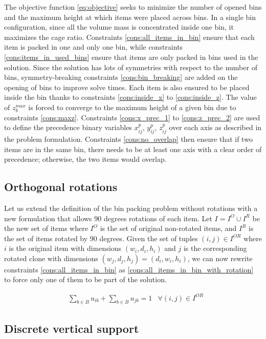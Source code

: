 The objective function \ref{eq:objective} seeks to minimize the number of opened bins and the maximum height at which items were placed across bins.
In a single bin configuration, since all the volume mass is concentrated inside one bin, it maximizes the cage ratio.
Constraints \ref{cons:all_items_in_bin} ensure that each item is packed in one and only one bin, while constraints \ref{cons:items_in_used_bins} ensure that items are only packed in bins used in the solution.
Since the solution has lots of symmetries with respect to the number of bins, symmetry-breaking constraints \ref{cons:bin_breaking} are added on the opening of bins to improve solve times.
Each item is also ensured to be placed inside the bin thanks to constraints \ref{cons:inside_x} to \ref{cons:inside_z}.
The value of $z^{max}_b$ is forced to converge to the maximum height of a given bin due to constraints \ref{cons:maxz}.
Constraints \ref{cons:x_prec_1} to \ref{cons:z_prec_2} are used to define the precedence binary variables $x^p_{ij}$, $y^p_{ij}$, $z^p_{ij}$ over each axis as described in the problem formulation.
Constraints \ref{cons:no_overlap} then ensure that if two items are in the same bin, there needs to be at least one axis with a clear order of precedence; otherwise, the two items would overlap.
\subsection{Orthogonal rotations}
\label{subsec:orthogonal_rotations}%

Let us extend the definition of the bin packing problem without rotations with a new formulation that allows $90$ degrees rotations of each item.
Let $I = I^O \cup I^R$ be the new set of items where $I^O$ is the set of original non-rotated items, and $I^R$ is the set of items rotated by $90$ degrees.
Given the set of tuples $(i, j) \in I^{OR}$ where $i$ is the original item with dimensions $(w_i, d_i, h_i)$ and $j$ is the corresponding rotated clone with dimensions $(w_j, d_j, h_j) = (d_i, w_i, h_i)$, we can now rewrite constraints \ref{cons:all_items_in_bin} as \ref{cons:all_items_in_bin_with_rotation} to force only one of them to be part of the solution.

\begin{align}
    & \sum\limits_{b \in B} u_{ib} + \sum\limits_{b \in B} u_{jb} = 1 & \forall (i, j) \in I^{OR} \label{cons:all_items_in_bin_with_rotation}
\end{align}

\subsection{Discrete vertical support}
\label{subsec:vertical_support_formulation}%

